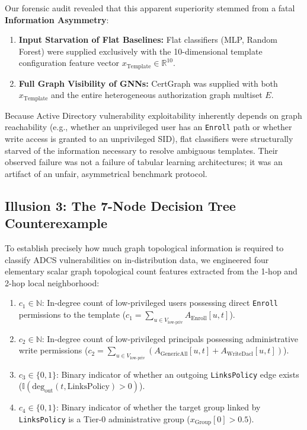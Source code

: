 Our forensic audit revealed that this apparent superiority stemmed from a fatal \textbf{Information Asymmetry}:
\begin{enumerate}
    \item \textbf{Input Starvation of Flat Baselines:} Flat classifiers (MLP, Random Forest) were supplied exclusively with the 10-dimensional template configuration feature vector $x_{\text{Template}} \in \mathbb{R}^{10}$.
    \item \textbf{Full Graph Visibility of GNNs:} CertGraph was supplied with both $x_{\text{Template}}$ and the entire heterogeneous authorization graph multiset $E$.
\end{enumerate}

Because Active Directory vulnerability exploitability inherently depends on graph reachability (e.g., whether an unprivileged user has an \texttt{Enroll} path or whether write access is granted to an unprivileged SID), flat classifiers were structurally starved of the information necessary to resolve ambiguous templates. Their observed failure was not a failure of tabular learning architectures; it was an artifact of an unfair, asymmetrical benchmark protocol.

\subsection{Illusion 3: The 7-Node Decision Tree Counterexample}
To establish precisely how much graph topological information is required to classify ADCS vulnerabilities on in-distribution data, we engineered four elementary scalar graph topological count features extracted from the 1-hop and 2-hop local neighborhood:
\begin{enumerate}
    \item $c_1 \in \mathbb{N}$: In-degree count of low-privileged users possessing direct \texttt{Enroll} permissions to the template ($c_1 = \sum_{u \in V_{\text{low-priv}}} A_{\text{Enroll}}[u, t]$).
    \item $c_2 \in \mathbb{N}$: In-degree count of low-privileged principals possessing administrative write permissions ($c_2 = \sum_{u \in V_{\text{low-priv}}} (A_{\text{GenericAll}}[u, t] + A_{\text{WriteDacl}}[u, t])$).
    \item $c_3 \in \{0, 1\}$: Binary indicator of whether an outgoing \texttt{LinksPolicy} edge exists ($\mathbb{I}(\text{deg}_{\text{out}}(t, \text{LinksPolicy}) > 0)$).
    \item $c_4 \in \{0, 1\}$: Binary indicator of whether the target group linked by \texttt{LinksPolicy} is a Tier-0 administrative group ($x_{\text{Group}}[0] > 0.5$).
\end{enumerate}

